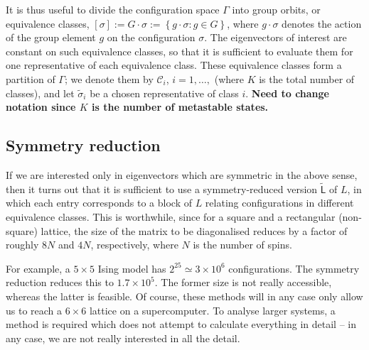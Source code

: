 \documentclass[10pt]{article}
\newcommand{\defeq}{:=}
\newcommand{\set}[1]{\left\{ #1 \right\}}
\newcommand{\equivclass}[1]{\left[ #1 \right]}
\newcommand{\LL}{\mathsf{L}}
\newcommand{\tL}{\tilde{\LL}}
\newcommand{\class}{\mathcal{C}}
\newcommand{\ts}{\tilde{\sigma}}
\begin{document}
It is thus useful to divide the configuration space $\Gamma$ into group orbits,
or equivalence classes, $\equivclass{\sigma} \defeq G \cdot \sigma 
\defeq \set{g\cdot \sigma: g \in G}$, where $g \cdot \sigma$ denotes the
action of the group element $g$ on the configuration $\sigma$. 
The eigenvectors of interest are constant on such equivalence classes, so that
it is sufficient to evaluate them for one representative of each equivalence
class.  
These equivalence classes form a partition of $\Gamma$;  we denote them by
$\class_i$, $i=1,\ldots,$ (where $K$ is the total number of classes), and
let
$\ts_i$ be a chosen representative of class $i$.  \textbf{Need to change
notation since $K$ is the number of metastable states.}

\subsection{Symmetry reduction}

If we are interested only in eigenvectors which are symmetric in the above
sense, then it turns out that it is sufficient to use a symmetry-reduced
version $\tL$ of $L$, in which each entry corresponds to a block of $L$
relating configurations in different equivalence classes.  
This is worthwhile, since 
for a square and a rectangular (non-square) lattice, the size of the
matrix to be diagonalised reduces by a factor of roughly $8N$ and $4N$,
respectively, where $N$ is the number of spins.

For example, a $5 \times 5$ Ising model has $2^25 \simeq 3 \times 10^6$
configurations. The symmetry reduction reduces this to $1.7 \times 10^5$. 
The former size is not really accessible, whereas the latter is 
feasible.  Of course, these methods will in any case only allow us to reach 
a $6 \times 6$ lattice on a supercomputer.  To analyse larger
systems, a method is required which does not attempt to calculate everything in
detail -- in any case, we are not really interested in all the detail.
\end{document}
